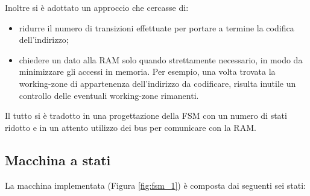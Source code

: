 Inoltre si è adottato un approccio che cercasse di:
\begin{itemize}
	\item ridurre il numero di transizioni effettuate per portare a termine la codifica dell'indirizzo;
	
	\item chiedere un dato alla RAM solo quando strettamente necessario, in modo da minimizzare gli accessi in memoria. Per esempio, una volta trovata la working-zone di appartenenza dell'indirizzo da codificare, risulta inutile un controllo delle eventuali working-zone rimanenti.
\end{itemize}
Il tutto si è tradotto in una progettazione della FSM con un numero di stati ridotto e in un attento utilizzo dei bus per comunicare con la RAM. 

\pagebreak

\subsection{Macchina a stati}
La macchina implementata (Figura \ref{fig:fsm_1}) è composta dai seguenti sei stati:

